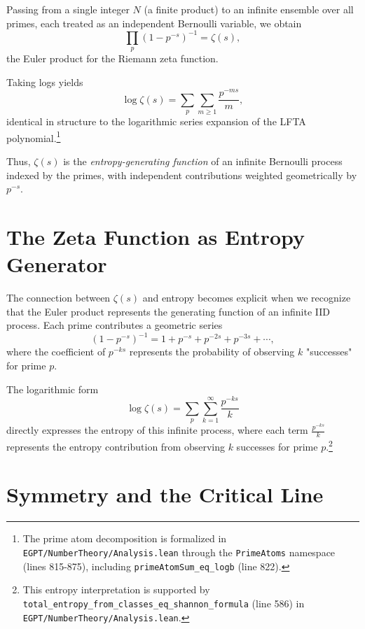 \documentclass[12pt]{article}
\begin{document}
Passing from a single integer $N$ (a finite product) to an infinite ensemble over all primes, each treated as an independent Bernoulli variable, we obtain
\begin{equation}
\prod_{p}(1 - p^{-s})^{-1} = \zeta(s),
\end{equation}
the Euler product for the Riemann zeta function.

Taking logs yields
\begin{equation}
\log \zeta(s) = \sum_{p}\sum_{m\ge1}\frac{p^{-ms}}{m},
\end{equation}
identical in structure to the logarithmic series expansion of the LFTA polynomial.\footnote{The prime atom decomposition is formalized in \texttt{EGPT/NumberTheory/Analysis.lean} through the \texttt{PrimeAtoms} namespace (lines 815-875), including \texttt{primeAtomSum\_eq\_logb} (line 822).}

Thus, $\zeta(s)$ is the \emph{entropy-generating function} of an infinite Bernoulli process indexed by the primes, with independent contributions weighted geometrically by $p^{-s}$.

\section{The Zeta Function as Entropy Generator}

The connection between $\zeta(s)$ and entropy becomes explicit when we recognize that the Euler product represents the generating function of an infinite IID process. Each prime contributes a geometric series
\begin{equation}
(1 - p^{-s})^{-1} = 1 + p^{-s} + p^{-2s} + p^{-3s} + \cdots,
\end{equation}
where the coefficient of $p^{-ks}$ represents the probability of observing $k$ "successes" for prime $p$.

The logarithmic form
\begin{equation}
\log \zeta(s) = \sum_{p}\sum_{k=1}^{\infty} \frac{p^{-ks}}{k}
\end{equation}
directly expresses the entropy of this infinite process, where each term $\frac{p^{-ks}}{k}$ represents the entropy contribution from observing $k$ successes for prime $p$.\footnote{This entropy interpretation is supported by \texttt{total\_entropy\_from\_classes\_eq\_shannon\_formula} (line 586) in \texttt{EGPT/NumberTheory/Analysis.lean}.}

\section{Symmetry and the Critical Line}
\end{document}
